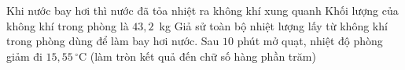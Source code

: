 \begin{ex}
		{Khi nước bay hơi thì nước đã tỏa nhiệt ra không khí xung quanh}
		{\True Khối lượng của không khí trong phòng là $43{,}2$~kg}
		{\True Giả sử toàn bộ nhiệt lượng lấy từ không khí trong phòng dùng để làm bay hơi nước. Sau $10$ phút mở quạt, nhiệt độ phòng giảm đi $15{,}55\,^\circ\text{C}$ (làm tròn kết quả đến chữ số hàng phần trăm)}
	\end{ex}

